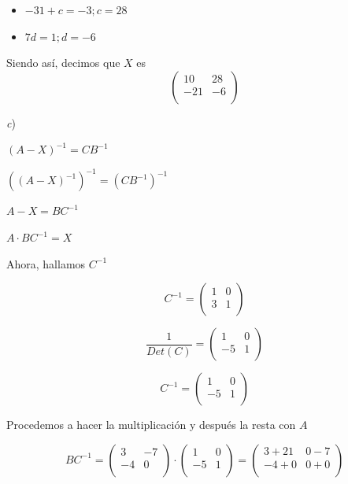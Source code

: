\documentclass[11pt,a4paper]{article}
\begin{document}
\begin{enumerate}
\begin{itemize}
\item $-31+c=-3; c = 28$ 
\end{itemize}

\begin{itemize}
\item $7d=1; d=-6$ 
\end{itemize}


Siendo así, decimos que $X$ es
$$
\begin{pmatrix} 
10 & 28 \\
-21  & -6 \\
\end{pmatrix}
$$

\textit{c}) 

\begin{center}

$(A-X)^{-1} = CB^{-1}$

$((A-X)^{-1})^{-1} = (CB^{-1})^{-1}$

$A-X = BC^{-1}$

$A \cdot BC^{-1} = X$

\end{center}

Ahora, hallamos $C^{-1}$

$$
C^{-1} =
\begin{pmatrix} 
1 & 0 \\
3  & 1 \\
\end{pmatrix}
$$

$$
\dfrac{1}{Det(C)} =
\begin{pmatrix} 
1 & 0 \\
-5  & 1 \\
\end{pmatrix}
$$

$$
C^{-1} =
\begin{pmatrix} 
1 & 0 \\
-5  & 1 \\
\end{pmatrix}
$$

Procedemos a hacer la multiplicación y después la resta con $A$

$$
BC^{-1} =
\begin{pmatrix} 
3 & -7 \\
-4  & 0 \\
\end{pmatrix}
\cdot
\begin{pmatrix} 
1 & 0 \\
-5  & 1 \\
\end{pmatrix}
=
\begin{pmatrix} 
3+21 & 0-7 \\
-4+0  & 0+0 \\
\end{pmatrix}
$$



\end{enumerate}
\end{document}
